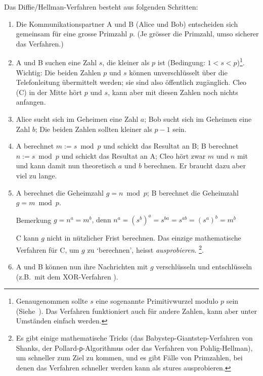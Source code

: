 Das Diffie/Hellman-Verfahren besteht aus folgenden Schritten:
\begin{enumerate}
    \item Die Kommunikationspartner A und B (Alice und Bob) entscheiden sich
    gemeinsam für eine grosse Primzahl $p$. (Je grösser die Primzahl, umso
    sicherer das Verfahren.)

    \item A und B suchen eine Zahl $s$, die kleiner als $p$ ist
    (Bedingung: $1 < s < p$)\footnote{Genaugenommen sollte $s$ eine sogenannte
    Primitivwurzel modulo $p$ sein (Siehe~\cite{buchmann}). Das Verfahren
    funktioniert auch für andere Zahlen, kann aber unter Umständen einfach werden.}.
    Wichtig: Die beiden Zahlen $p$ und $s$ können unverschlüsselt über die
    Telefonleitung übermittelt werden; sie sind also öffentlich zugänglich.
    Cleo (C) in der Mitte hört $p$ und $s$, kann aber mit diesen Zahlen
    noch nichts anfangen.

    \item Alice sucht sich im Geheimen eine Zahl $a$; Bob sucht sich im Geheimen
    eine Zahl $b$; Die beiden Zahlen sollten kleiner als $p − 1$ sein.

    \item A berechnet $m := s \bmod p$ und schickt das Resultat an B;
    B berechnet $n := s \bmod p$ und schickt das Resultat an A;
    Cleo hört zwar $m$ und $n$ mit und kann damit nun theoretisch $a$ und $b$
    berechnen. Er braucht dazu aber viel zu lange.

    \item A berechnet die Geheimzahl $g = n \bmod p$;
    B berechnet die Geheimzahl $g = m \bmod p$.

    Bemerkung $g = n^a = m^b \text{, denn } n^a = {(s^b)}^a = s^{ba} = s^{ab} = {(s^a)}^b = m^b$

    C kann $g$ nicht in nützlicher Frist berechnen. Das einzige mathematische Verfahren für C,
    um $g$ zu `berechnen', heisst \emph{ausprobieren}.
    \footnote{Es gibt einige mathematische Tricks (das Babystep-Giantstep-Verfahren von
    Shanks, der Pollard-ρ-Algorithmus oder das Verfahren von Pohlig-Hellman), um schneller
    zum Ziel zu kommen, und es gibt Fälle von Primzahlen, bei denen das Verfahren schneller
    werden kann als stures ausprobieren.}.

    \item A und B können nun ihre Nachrichten mit $g$ verschlüsseln und entschlüsseln
    (z.B.~mit dem XOR-Verfahren ).
\end{enumerate}

